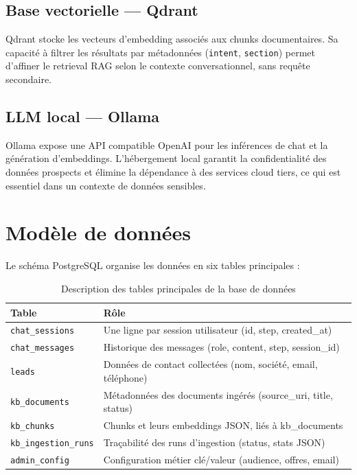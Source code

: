 \documentclass[12pt,a4paper]{report}
\begin{document}
\subsection{Base vectorielle — Qdrant}

Qdrant stocke les vecteurs d'embedding associés aux chunks documentaires. Sa capacité
à filtrer les résultats par métadonnées (\texttt{intent}, \texttt{section}) permet
d'affiner le retrieval RAG selon le contexte conversationnel, sans requête secondaire.

\subsection{LLM local — Ollama}

Ollama expose une API compatible OpenAI pour les inférences de chat et la génération
d'embeddings. L'hébergement local garantit la confidentialité des données prospects et
élimine la dépendance à des services cloud tiers, ce qui est essentiel dans un contexte
de données sensibles.

\section{Modèle de données}

Le schéma PostgreSQL organise les données en six tables principales :

\begin{table}[H]
\centering
\caption{Description des tables principales de la base de données}
\small
\begin{tabularx}{\textwidth}{|l|X|}
\hline
\rowcolor{tableheader}
\textbf{Table} & \textbf{Rôle} \\
\hline
\texttt{chat\_sessions} & Une ligne par session utilisateur (id, step, created\_at) \\
\hline
\texttt{chat\_messages} & Historique des messages (role, content, step, session\_id) \\
\hline
\texttt{leads} & Données de contact collectées (nom, société, email, téléphone) \\
\hline
\texttt{kb\_documents} & Métadonnées des documents ingérés (source\_uri, title, status) \\
\hline
\texttt{kb\_chunks} & Chunks et leurs embeddings JSON, liés à kb\_documents \\
\hline
\texttt{kb\_ingestion\_runs} & Traçabilité des runs d'ingestion (status, stats JSON) \\
\hline
\texttt{admin\_config} & Configuration métier clé/valeur (audience, offres, email) \\
\hline
\end{tabularx}
\label{tab:schema}
\end{table}
\end{document}

